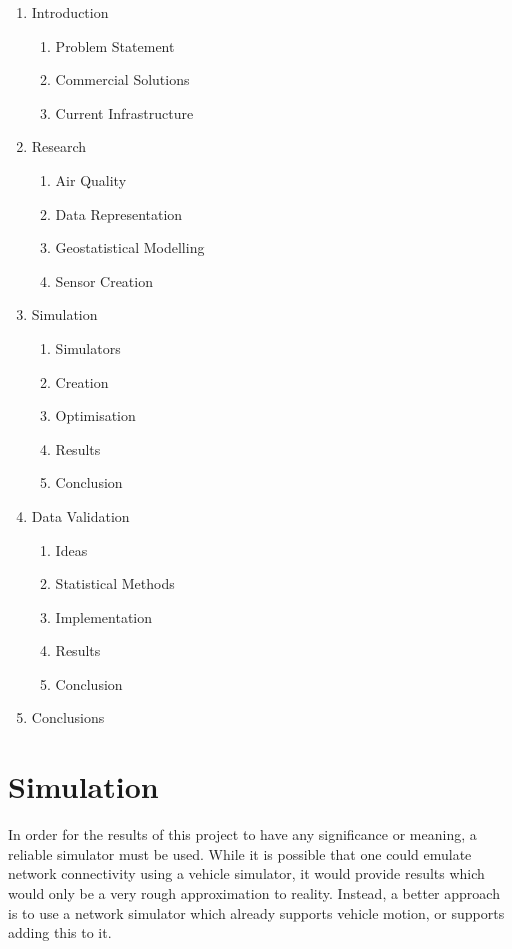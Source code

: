 \documentclass[12pt,a4paper,notitlepage]{article}
\begin{document}
\begin{enumerate}[itemsep=0mm]
	\item Introduction
		\begin{enumerate}[itemsep=-2mm]
			\item Problem Statement
			\item Commercial Solutions
			\item Current Infrastructure
		\end{enumerate}
	\item Research
		\begin{enumerate}[itemsep=-2mm]
			\item Air Quality
			\item Data Representation
			\item Geostatistical Modelling
			\item Sensor Creation
		\end{enumerate}
	\item Simulation
		\begin{enumerate}[itemsep=-2mm]
			\item Simulators
			\item Creation
			\item Optimisation
			\item Results
			\item Conclusion
		\end{enumerate}
	\item Data Validation
		\begin{enumerate}[itemsep=-2mm]
			\item Ideas
			\item Statistical Methods
			\item Implementation
			\item Results
			\item Conclusion
		\end{enumerate}
	\item Conclusions
\end{enumerate}

\section{Simulation}

In order for the results of this project to have any significance or meaning, a reliable simulator must be used. While it is possible that one could emulate network connectivity using a vehicle simulator, it would provide results which would only be a very rough approximation to reality. Instead, a better approach is to use a network simulator which already supports vehicle motion, or supports adding this to it. 
\end{document}
